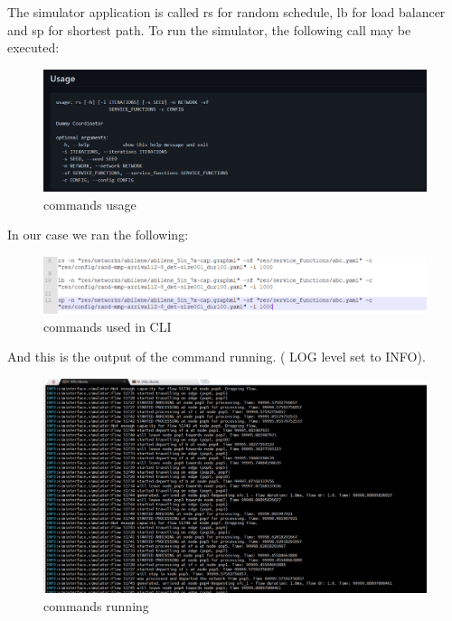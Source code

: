 The simulator application is called rs for random schedule, lb for load balancer and sp for shortest path. To run the simulator, the following call may be executed:

\begin{figure}[h]
    \centering
    \includegraphics[width=1\textwidth]{terminal}
    \caption{commands usage}
    \label{fig:terminal}
\end{figure}

In our case we ran the following:

\begin{figure}[h]
    \centering
    \includegraphics[width=1\textwidth]{commands}
    \caption{commands used in CLI}
    \label{fig:commands}
\end{figure}


And this is the output of the command running. ( LOG level set to INFO).

\begin{figure}[h]
    \centering
    \includegraphics[width=1\textwidth]{simulation_info_level}
    \caption{commands running}
    \label{fig:simulation_info_level}
\end{figure}
